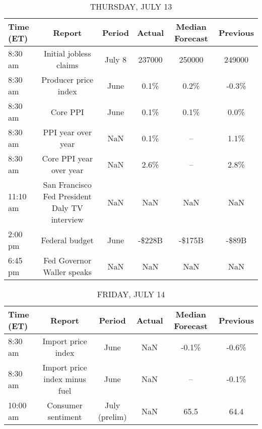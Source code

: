\documentclass{article}%
\begin{document}
\begin{table}[htbp]%
\caption{THURSDAY, JULY 13}%
\centering%
\begin{adjustbox}{width=1\textwidth}%
\begin{tabular}{lccccc}
\toprule
Time (ET) &                                        Report & Period & Actual & Median Forecast & Previous \\
\midrule
  8:30 am &                        Initial jobless claims & July 8 & 237000 &          250000 &   249000 \\
  8:30 am &                          Producer price index &   June &   0.1\% &            0.2\% &    -0.3\% \\
  8:30 am &                                      Core PPI &   June &   0.1\% &            0.1\% &     0.0\% \\
  8:30 am &                            PPI year over year &    NaN &   0.1\% &              -- &     1.1\% \\
  8:30 am &                       Core PPI year over year &    NaN &   2.6\% &              -- &     2.8\% \\
 11:10 am & San Francisco Fed President Daly TV interview &    NaN &    NaN &             NaN &      NaN \\
  2:00 pm &                                Federal budget &   June & -\$228B &          -\$175B &    -\$89B \\
  6:45 pm &                    Fed Governor Waller speaks &    NaN &    NaN &             NaN &      NaN \\
\bottomrule
\end{tabular}
%
\end{adjustbox}%
\end{table}

%


\begin{table}[htbp]%
\caption{FRIDAY, JULY 14}%
\centering%
\begin{adjustbox}{width=1\textwidth}%
\begin{tabular}{lccccc}
\toprule
Time (ET) &                        Report &        Period & Actual & Median Forecast & Previous \\
\midrule
  8:30 am &            Import price index &          June &    NaN &           -0.1\% &    -0.6\% \\
  8:30 am & Import price index minus fuel &          June &    NaN &              -- &    -0.1\% \\
 10:00 am &            Consumer sentiment & July (prelim) &    NaN &            65.5 &     64.4 \\
\bottomrule
\end{tabular}
%
\end{adjustbox}%
\end{table}
\end{document}
